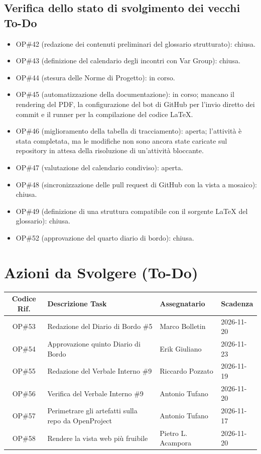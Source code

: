 \documentclass[a4paper, 11pt]{article}
\begin{document}
\subsection{Verifica dello stato di svolgimento dei vecchi To-Do}
\begin{itemize}
    \item OP\#42 (redazione dei contenuti preliminari del glossario strutturato): chiusa.
    \item OP\#43 (definizione del calendario degli incontri con Var Group): chiusa.
    \item OP\#44 (stesura delle Norme di Progetto): in corso.
    \item OP\#45 (automatizzazione della documentazione): in corso; mancano il rendering del PDF, la configurazione del bot di GitHub per l'invio diretto dei commit e il runner per la compilazione del codice LaTeX.
    \item OP\#46 (miglioramento della tabella di tracciamento): aperta; l'attività è stata completata, ma le modifiche non sono ancora state caricate sul repository in attesa della risoluzione di un'attività bloccante.
    \item OP\#47 (valutazione del calendario condiviso): aperta.
    \item OP\#48 (sincronizzazione delle pull request di GitHub con la vista a mosaico): chiusa.
    \item OP\#49 (definizione di una struttura compatibile con il sorgente LaTeX del glossario): chiusa.
    \item OP\#52 (approvazione del quarto diario di bordo): chiusa.
\end{itemize}


\vspace{0.5cm}
\section{Azioni da Svolgere (To-Do)}
\begin{tabularx}{\textwidth}{|c|X|l|l|}
\hline
\textbf{Codice Rif.} & \textbf{Descrizione Task} & \textbf{Assegnatario} & \textbf{Scadenza} \\ \hline
OP\#53 & Redazione del Diario di Bordo \#5 & Marco Bolletin
 & 2026-11-20 \\ \hline
OP\#54 & Approvazione quinto Diario di Bordo & Erik Giuliano
 & 2026-11-23 \\ \hline
OP\#55 & Redazione del Verbale Interno \#9 & Riccardo Pozzato
 & 2026-11-19 \\ \hline
OP\#56 & Verifica del Verbale Interno \#9 & Antonio Tufano
 & 2026-11-20 \\ \hline
OP\#57 & Perimetrare gli artefatti sulla repo da OpenProject & Antonio Tufano
 & 2026-11-17 \\ \hline
OP\#58 & Rendere la vista web più fruibile & Pietro L. Acampora
 & 2026-11-20 \\ \hline
\end{tabularx}
\end{document}
